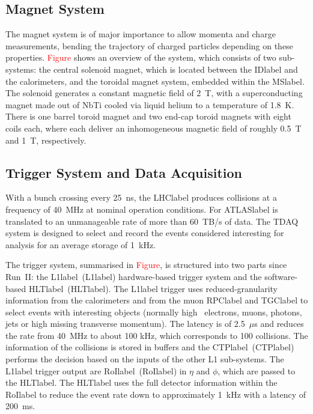 
\subsection{Magnet System}

The magnet system is of major importance to allow momenta and charge measurements, bending the trajectory of charged particles depending on these properties. \textcolor{red}{Figure} shows an overview of the system, which consists of two sub-systems: the central solenoid magnet, which is located between the \acrshort{IDlabel} and the calorimeters, and the toroidal magnet system, embedded within the \acrshort{MSlabel}. The solenoid generates a constant magnetic field of 2~T, with a superconducting magnet made out of NbTi cooled via liquid helium to a temperature of 1.8~K. There is one barrel toroid magnet and two end-cap toroid magnets with eight coils each, where each deliver an inhomogeneous magnetic field of roughly 0.5~T and 1~T, respectively.


\subsection{Trigger System and Data Acquisition}

With a bunch crossing every 25~ns, the \acrshort{LHClabel} produces collisions at a frequency of 40~MHz at nominal operation conditions. For \acrshort{ATLASlabel} is translated to an unmanageable rate of more than 60~TB/s of data. The TDAQ system is designed to select and record the events considered interesting for analysis for an average storage of 1~kHz.

The trigger system, summarised in \textcolor{red}{Figure}, is structured into two parts since Run~II: the \acrlong{L1label}~(\acrshort{L1label}) hardware-based trigger system and the software-based \acrlong{HLTlabel}~(\acrshort{HLTlabel}). The \acrshort{L1label} trigger uses reduced-granularity information from the calorimeters and from the muon \acrshort{RPClabel} and \acrshort{TGClabel} to select events with interesting objects (normally high \pT\ electrons, muons, photons, jets or high missing transverse momentum). The latency is of 2.5~$\mu$s and reduces the rate from 40~MHz to about 100 kHz, which corresponds to 100 collisions. The information of the collisions is stored in buffers and the \acrlong{CTPlabel}~(\acrshort{CTPlabel}) performs the decision based on the inputs of the other L1 sub-systems. The \acrshort{L1label} trigger output are \acrlong{RoIlabel}~(\acrshort{RoIlabel}) in $\eta$ and $\phi$, which are passed to the \acrshort{HLTlabel}. The \acrshort{HLTlabel} uses the full detector information within the \acrshort{RoIlabel} to reduce the event rate down to approximately 1~kHz with a latency of 200~ms.

